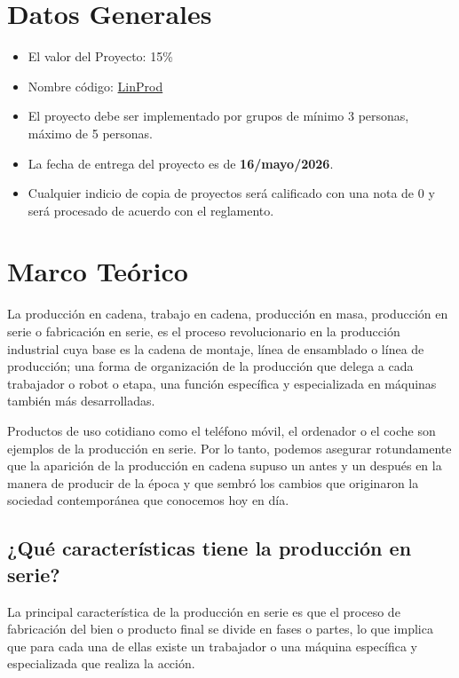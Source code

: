 \documentclass[12pt,letterpaper]{article}
\begin{document}
\section*{Datos Generales}
\begin{itemize}[leftmargin=2em]
    \item El valor del Proyecto: 15\%
    \item Nombre código: \underline{LinProd}
    \item El proyecto debe ser implementado por grupos de mínimo 3 personas, máximo de 5 personas.
    \item La fecha de entrega del proyecto es de \textbf{16/mayo/2026}.
    \item Cualquier indicio de copia de proyectos será calificado con una nota de 0 y será procesado de acuerdo con el reglamento.
\end{itemize}

\section*{Marco Teórico}

La producción en cadena, trabajo en cadena, producción en masa, producción en serie o fabricación en serie, es el proceso revolucionario en la producción industrial cuya base es la cadena de montaje, línea de ensamblado o línea de producción; una forma de organización de la producción que delega a cada trabajador o robot o etapa, una función específica y especializada en máquinas también más desarrolladas.

Productos de uso cotidiano como el teléfono móvil, el ordenador o el coche son ejemplos de la producción en serie. Por lo tanto, podemos asegurar rotundamente que la aparición de la producción en cadena supuso un antes y un después en la manera de producir de la época y que sembró los cambios que originaron la sociedad contemporánea que conocemos hoy en día.

\subsection*{¿Qué características tiene la producción en serie?}

La principal característica de la producción en serie es que el proceso de fabricación del bien o producto final se divide en fases o partes, lo que implica que para cada una de ellas existe un trabajador o una máquina específica y especializada que realiza la acción.
\end{document}
